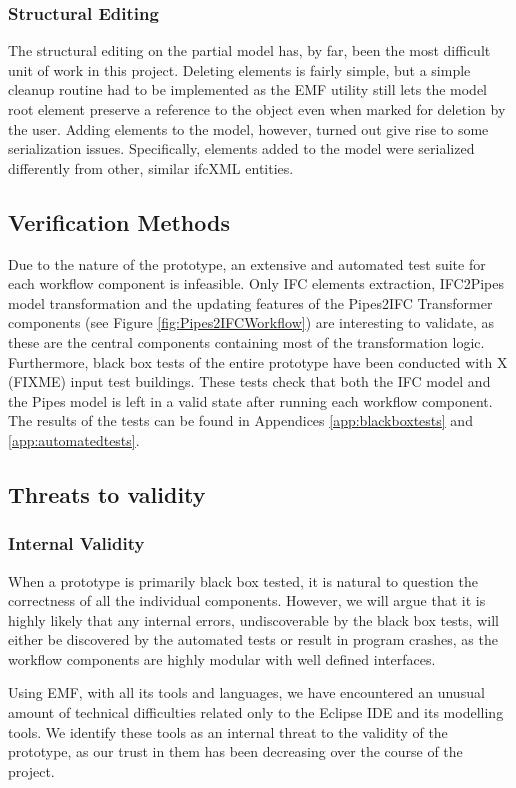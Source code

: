 \subsubsection{Structural Editing} The structural editing on the partial model has, by far, been the most difficult unit of work in this project. Deleting elements is fairly simple, but a simple cleanup routine had to be implemented as the EMF utility still lets the model root element preserve a reference to the object even when marked for deletion by the user. Adding elements to the model, however, turned out give rise to some serialization issues. Specifically, elements added to the model were serialized differently from other, similar ifcXML entities.

\subsection{Verification Methods}
\label{subsec:verification_methods}
Due to the nature of the prototype, an extensive and automated test suite for each workflow component is infeasible. Only IFC elements extraction, IFC2Pipes model transformation and the updating features of the Pipes2IFC Transformer components (see Figure \ref{fig:Pipes2IFCWorkflow}) are interesting to validate, as these are the central components containing most of the transformation logic. Furthermore, black box tests of the entire prototype have been conducted with X (FIXME) input test buildings. These tests check that both the IFC model and the Pipes model is left in a valid state after running each workflow component. The results of the tests can be found in Appendices \ref{app:blackboxtests} and \ref{app:automatedtests}.

\subsection{Threats to validity}
\subsubsection{Internal Validity} When a prototype is primarily black box tested, it is natural to question the correctness of all the individual components. However, we will argue that it is highly likely that any internal errors, undiscoverable by the black box tests, will either be discovered by the automated tests or result in program crashes, as the workflow components are highly modular with well defined interfaces.

Using EMF, with all its tools and languages, we have encountered an unusual amount of technical difficulties related only to the Eclipse IDE and its modelling tools. We identify these tools as an internal threat to the validity of the prototype, as our trust in them has been decreasing over the course of the project.

